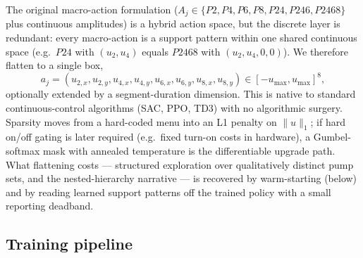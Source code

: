 \documentclass[11pt]{article}
\begin{document}
The original macro-action formulation ($A_j \in \{P2, P4, P6, P8, P24, P246, P2468\}$ plus continuous amplitudes) is a hybrid action space, but the discrete layer is redundant: every macro-action is a support pattern within one shared continuous space (e.g.\ $P24$ with $(u_2, u_4)$ equals $P2468$ with $(u_2, u_4, 0, 0)$). We therefore flatten to a single box,
\begin{equation}
a_j = (u_{2,x}, u_{2,y}, u_{4,x}, u_{4,y}, u_{6,x}, u_{6,y}, u_{8,x}, u_{8,y}) \in [-u_{\max}, u_{\max}]^8,
\end{equation}
optionally extended by a segment-duration dimension. This is native to standard continuous-control algorithms (SAC, PPO, TD3) with no algorithmic surgery. Sparsity moves from a hard-coded menu into an L1 penalty on $\|u\|_1$; if hard on/off gating is later required (e.g.\ fixed turn-on costs in hardware), a Gumbel-softmax mask with annealed temperature is the differentiable upgrade path. What flattening costs --- structured exploration over qualitatively distinct pump sets, and the nested-hierarchy narrative --- is recovered by warm-starting (below) and by reading learned support patterns off the trained policy with a small reporting deadband.

\subsection*{Training pipeline}
\end{document}

